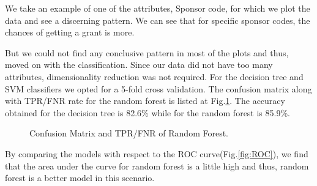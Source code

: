 \documentclass{article} %
\begin{document}
	We take an example of one of the attributes, Sponsor code, for which we plot the data and see a discerning pattern. We can see that for specific sponsor codes, the chances of getting a grant is more.
	
	But we could not find any conclusive pattern in most of the plots and thus, moved on with the classification. Since our data did not have too many attributes, dimensionality reduction was not required. For the decision tree and SVM classifiers we opted for a 5-fold cross validation. The confusion matrix along with TPR/FNR rate for the random forest is listed at Fig.\ref{fig:RFCM}. The accuracy obtained for the decision tree is 82.6\% while for the random forest is 85.9\%.
	
	\begin{figure}[h]
		\begin{center}
		\end{center}
		\caption{Confusion Matrix and TPR/FNR of Random Forest.}
		\label{fig:RFCM}
	\end{figure}
	
	By comparing the models with respect to the ROC curve(Fig.\ref{fig:ROC}), we find that the area under the curve for random forest is a little high and thus, random forest is a better model in this scenario.
	
\end{document}
